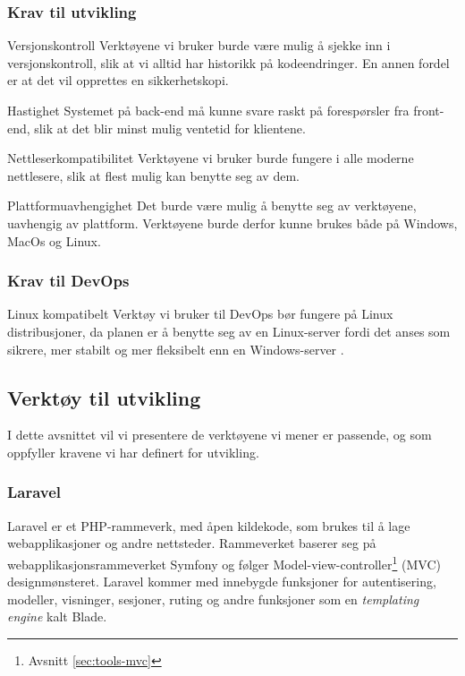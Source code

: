 \subsubsection{Krav til utvikling}
\label{sec:analysis-tools-requirements-back-end}
\begin{compactdesc}
\item [Versjonskontroll] Verktøyene vi bruker burde være mulig å sjekke inn i versjonskontroll, slik at vi alltid har historikk på kodeendringer. En annen fordel er at det vil opprettes en sikkerhetskopi.
\item [Hastighet] Systemet på back-end må kunne svare raskt på forespørsler fra front-end, slik at det blir minst mulig ventetid for klientene.
\item [Nettleserkompatibilitet] Verktøyene vi bruker burde fungere i alle moderne nettlesere, slik at flest mulig kan benytte seg av dem.
\item [Plattformuavhengighet] Det burde være mulig å benytte seg av verktøyene, uavhengig av plattform. Verktøyene burde derfor kunne brukes både på Windows, MacOs og Linux.
\end{compactdesc}

\subsubsection{Krav til DevOps}
\begin{compactdesc}
\item [Linux kompatibelt] Verktøy vi bruker til DevOps bør fungere på Linux distribusjoner, da planen er å benytte seg av en Linux-server fordi det anses som sikrere, mer stabilt og mer fleksibelt enn en Windows-server \cite{cabrera2009windows}.
\end{compactdesc}

\subsection{Verktøy til utvikling}
I dette avsnittet vil vi presentere de verktøyene vi mener er passende, og som oppfyller kravene vi har definert for utvikling. 

\subsubsection{Laravel}
Laravel \cite{cbcp2019lvw} er et PHP-rammeverk, med åpen kildekode, som brukes til å lage webapplikasjoner og andre nettsteder. Rammeverket baserer seg på webapplikasjonsrammeverket Symfony og følger Model-view-controller\footnote{Avsnitt \ref{sec:tools-mvc}} (MVC) designmønsteret.
Laravel kommer med innebygde funksjoner for autentisering, modeller, visninger, sesjoner, ruting og andre funksjoner som en \textit{templating engine} kalt Blade.

